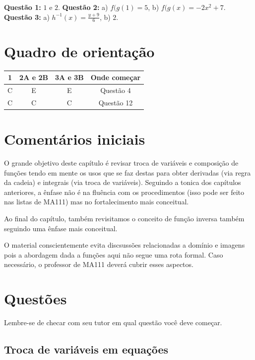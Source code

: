 \documentclass[main.tex]{subfiles}
\begin{document}
\textbf{Questão 1:} $1$ e $2$. \textbf{Questão 2:} a) $f(g(1)=5$, b) $f(g(x)=-2x^2+7$. \textbf{Questão 3:} a) $h^{-1}(x)=\frac{y+9}{6}$, b) $2$.

\section{Quadro de orientação}

\begin{center}
 \begin{tabular}{|c c c |c|} 
 \hline
 1 & 2A e 2B & 3A e 3B & Onde começar\\
 \hline
 C & E & E & Questão 4 \\ 
 \hline
 C & C & C & Questão 12 \\ 
 \hline
\end{tabular}
\end{center}

\section{Comentários iniciais}

O grande objetivo deste capítulo é revisar troca de variáveis e composição de funções tendo em mente os usos que se faz destas para obter derivadas (via regra da cadeia) e integrais (via troca de variáveis). Seguindo a tonica dos capítulos anteriores, a ênfase não é na fluência com os procedimentos (isso pode ser feito nas listas de MA111) mas no fortalecimento mais conceitual.

Ao final do capítulo, também revisitamos o conceito de função inversa também seguindo uma ênfase mais conceitual.

O material conscientemente evita discsussões relacionadas a domínio e imagens pois a abordagem dada a funções aqui não segue uma rota formal. Caso necessário, o professor de MA111 deverá cubrir esses aspectos.

\paraAmbos

\newpage

\section{Questões}

Lembre-se de checar com seu tutor em qual questão você deve começar.

\subsection*{Troca de variáveis em equações}
\end{document}
